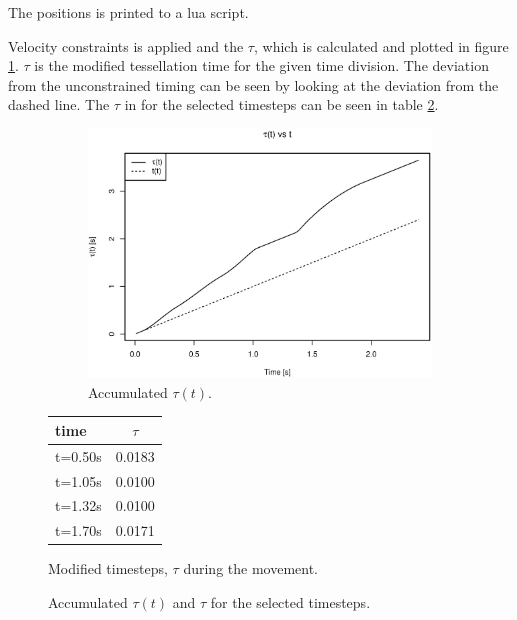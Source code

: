 The positions is printed to a lua script\cite{zip:luaScript}.

Velocity constraints is applied and the $\tau$, which is calculated and plotted in figure \ref{fig:tau_v_t}.
$\tau$ is the modified tessellation time for the given time division.
The deviation from the unconstrained timing can be seen by looking at the deviation from the dashed line.
The $\tau$ in for the selected timesteps can be seen in table \ref{tb:tau}.

\begin{figure}[h]
\begin{subfigure}{0.7\textwidth}
 \centering
 \includegraphics[width=\linewidth]{graphics/timeplot}
 \caption{Accumulated $\tau(t)$.}
 \label{fig:tau_v_t}
\end{subfigure}
% 
\begin{subtable}{0.29\textwidth}
\centering
\begin{tabular}{l|*{1}{c} }
 time    & $\tau$ \\ \hline       
 t=0.50s & 0.0183 \\
 t=1.05s & 0.0100 \\
 t=1.32s & 0.0100 \\
 t=1.70s & 0.0171 \\
\end{tabular}
\caption{Modified timesteps, $\tau$ during the movement.}
\label{tb:tau}
\end{subtable}
\caption{Accumulated $\tau(t)$ and $\tau$ for the selected timesteps.}
\end{figure}